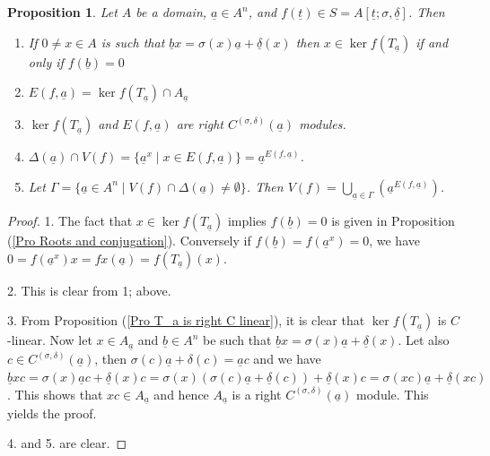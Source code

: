 \documentclass[12pt,a4paper]{article}
\newtheorem{proposition}[theorem]{Proposition}
\newcommand{\ut}{\underline{t}}
\newcommand{\ua}{\underline{a}}
\newcommand{\ub}{\underline{b}}
\newcommand{\ud}{\underline{\delta}}
\begin{document}
	\begin{proposition} \label{Pro for domain}
		Let $A$ be a domain, $\ua \in A^n$, and $f(\ut)\in S=A[\ut;\sigma,\ud]$. Then
		\begin{enumerate}
			\item If $0\ne x\in A$ is such that  $\ub x=\sigma(x)\ua + \ud(x)$ then 
			$x\in \ker f(T_{\ua}) $ if and only if $f(\ub)=0$
			\item $E(f,\ua)=\ker f(T_{\ua}) \cap A_{\ua}$
			\item $\ker f(T_{\ua})$ and $E(f,\ua)$ are right $C^{(\sigma,\delta)}(\ua)$ modules.
			\item $\Delta(\ua)\cap V(f)=\{\ua^x \mid x\in E(f,\ua)\}=\ua^{E(f,\ua)}$.
			\item Let $\Gamma =\{\ua \in A^n \mid V(f)\cap \Delta(\ua)\ne \emptyset \}$.  Then $V(f)=\bigcup_{\ua \in \Gamma} (\ua^{E(f,\ua)})$.       
		\end{enumerate}
	\end{proposition}
	\begin{proof}
		1.  The fact that $x\in \ker f(T_{\ua})$ implies $f(\ub)=0$ is given in Proposition (\ref{Pro Roots and conjugation}).  Conversely if $f(\ub)=f(\ua^x)=0$, we have 
		$0=f(\ua^x)x=fx(\ua)=f(T_{\ua})(x)$. 
		
		2.  This is clear from 1; above.
		
		3. From Proposition (\ref{Pro T_a is right C linear}), it is clear that $\ker f(T_{\ua})$ is $C$-linear.  Now let $x\in A_{\ua}$ and $\ub \in A^n$ be such that $\ub x=\sigma(x)\ua +\ud(x)$.  Let also $c\in C^{(\sigma,\delta)}(\ua)$, then $\sigma(c)\ua+\delta(c)=\ua c$ and we have $\ub xc=\sigma(x)\ua c + \ud (x)c=
		\sigma(x)(\sigma(c)\ua 
		+\ud(c))+\ud(x)c=\sigma(xc)\ua+\ud(xc)$.  This 
		shows that $xc\in A_{\ua}$ and hence $A_{\ua}$ 
		is a right $C^{(\sigma,\delta)}(\ua)$ module.  This yields the proof. 
		
		4. and 5. are clear.
	\end{proof}
	
	
	
\end{document}

